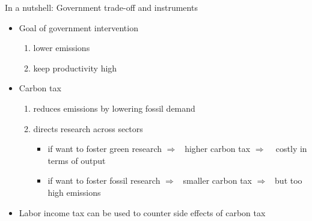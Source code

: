 \documentclass[11pt,aspectratio=169]{beamer}
\newcommand{\ar}{$\Rightarrow$ \ }
\begin{document}

		
		
		\begin{frame}{In a nutshell: Government trade-off and instruments}
			\pause
			\begin{itemize}[<+-| alert@+>]
				\item 	Goal of government intervention
				\begin{enumerate}
					\item[a)] lower emissions
					\item[b)] keep productivity high
				\end{enumerate}
				\vspace{3mm}
				\item Carbon tax
				\begin{enumerate}
					\item[a)] reduces emissions by lowering fossil demand
					\item[b)] directs research across sectors
					\begin{itemize}
						\item[-] if want to foster green research
						\ar higher carbon tax \ar %
						costly in terms of output %
						\item[-] if want to foster fossil research \ar smaller carbon tax \ar but too high emissions
					\end{itemize}
				\end{enumerate}
				\item Labor income tax can be used to counter side effects of carbon tax 
			\end{itemize}
		\end{frame}
		
\end{document}
